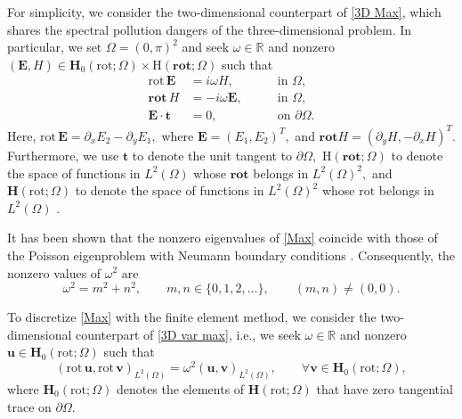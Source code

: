 For simplicity, we consider the two-dimensional counterpart of \eqref{3D Max}, which shares the spectral pollution dangers of the three-dimensional problem. In particular, we set $\Omega = (0, \pi)^2$ and seek $\omega \in \mathbb{R}$ and nonzero $(\mathbf{E}, H) \in \mathbf{H}_0(\text{rot}; \Omega) \times \text{H}(\textbf{rot};\Omega)$ such that 
\begin{subequations}\label{Max}
\begin{align}
    \text{rot} \, \mathbf{E} &= i  \omega H, \qquad &\text{in } \Omega,\label{eq:system-a}\\
    \textbf{rot} \,H &= -i \omega \mathbf{E}, \qquad &\text{in } \Omega,\label{eq:system-b}\\
    \mathbf{E} \cdot \mathbf{t} &= 0, \qquad &\text{on } \partial \Omega. \label{eq:system-c}
\end{align}
\end{subequations}
Here, $\text{rot} \, \mathbf{E} = \partial_x E_2 - \partial_y E_1,$ where $\mathbf{E} = (E_1, E_2)^T,$ and $\textbf{rot} H = (\partial_y H, -\partial_x H)^T.$
Furthermore, we use $\mathbf{t}$ to denote the unit tangent to $\partial \Omega,$ $\text{H}(\textbf{rot}; \Omega)$ to denote the space of functions in $L^2(\Omega)$ whose $\textbf{rot}$ belongs in $L^2(\Omega)^2,$ and $\mathbf{H}(\text{rot} ; \Omega)$ to denote the space of functions in $L^2(\Omega)^2$ whose $\text{rot}$ belongs in $L^2(\Omega)$ \cite{Matt}. 


It has been shown that the nonzero eigenvalues of \eqref{Max} coincide with those of the Poisson eigenproblem with Neumann boundary conditions \cite{Boffi}. Consequently, the nonzero values of $\omega^2$ are
\begin{equation}\label{exact eigs}
    \omega^2 = m^2+n^2,
    \qquad
    m,n\in\{0,1,2,\ldots\},
    \qquad
    (m,n)\neq(0,0).
\end{equation}

To discretize \eqref{Max} with the finite element method, we consider the two-dimensional counterpart of \eqref{3D var max}, i.e., we seek $\omega \in \mathbb{R}$ and nonzero $\mathbf{u} \in \mathbf{H}_0(\text{rot}; \Omega)$ such that
\begin{equation} \label{2D var max}
    ( \text{rot}\, \mathbf{u}, \text{rot} \, \mathbf{v})_{L^2(\Omega)} = \omega^2(\mathbf{u}, \mathbf{v})_{L^2(\Omega)}, \qquad \forall \mathbf{v} \in \mathbf{H}_0(\text{rot}; \Omega),
\end{equation}
where $\mathbf{H}_0(\text{rot} ; \Omega)$ denotes the elements of $\mathbf{H}(\text{rot} ; \Omega)$ that have zero tangential trace on $\partial \Omega.$

